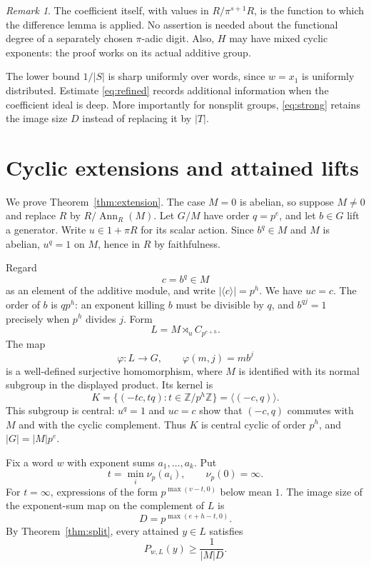\documentclass[11pt]{article}
\theoremstyle{remark}\newtheorem{remark}[theorem]{Remark}
\newcommand{\Ann}{\operatorname{Ann}}
\newcommand{\Z}{\mathbb Z}
\begin{document}
\begin{remark}
The coefficient itself, with values in $R/\pi^{s+1}R$, is the function to which the difference lemma is applied. No assertion is needed about the functional degree of a separately chosen $\pi$-adic digit. Also, $H$ may have mixed cyclic exponents: the proof works on its actual additive group.
\end{remark}

The lower bound $1/|S|$ is sharp uniformly over words, since $w=x_1$ is uniformly distributed. Estimate \eqref{eq:refined} records additional information when the coefficient ideal is deep. More importantly for nonsplit groups, \eqref{eq:strong} retains the image size $D$ instead of replacing it by $|T|$.

\section{Cyclic extensions and attained lifts}\label{sec:transfer}
We prove Theorem~\ref{thm:extension}. The case $M=0$ is abelian, so suppose $M\ne0$ and replace $R$ by $R/\Ann_R(M)$. Let $G/M$ have order $q=p^e$, and let $b\in G$ lift a generator. Write $u\in1+\pi R$ for its scalar action. Since $b^q\in M$ and $M$ is abelian, $u^q=1$ on $M$, hence in $R$ by faithfulness.

Regard
\[
 c=b^q\in M
\]
as an element of the additive module, and write $|\langle c\rangle|=p^h$. We have $uc=c$. The order of $b$ is $qp^h$: an exponent killing $b$ must be divisible by $q$, and $b^{qj}=1$ precisely when $p^h$ divides $j$. Form
\[
 L=M\rtimes_u C_{p^{e+h}}.
\]
The map
\begin{equation}\label{eq:cover}
 \varphi:L\longrightarrow G,\qquad \varphi(m,j)=m b^j
\end{equation}
is a well-defined surjective homomorphism, where $M$ is identified with its normal subgroup in the displayed product. Its kernel is
\begin{equation}\label{eq:kernel}
 K=\{(-tc,tq):t\in\Z/p^h\Z\}=\langle(-c,q)\rangle.
\end{equation}
This subgroup is central: $u^q=1$ and $uc=c$ show that $(-c,q)$ commutes with $M$ and with the cyclic complement. Thus $K$ is central cyclic of order $p^h$, and $|G|=|M|p^e$.

Fix a word $w$ with exponent sums $a_1,\ldots,a_k$. Put
\[
 t=\min_i\nu_p(a_i),\qquad \nu_p(0)=\infty.
\]
For $t=\infty$, expressions of the form $p^{\max(v-t,0)}$ below mean $1$. The image size of the exponent-sum map on the complement of $L$ is
\[
 D=p^{\max(e+h-t,0)}.
\]
By Theorem~\ref{thm:split}, every attained $y\in L$ satisfies
\begin{equation}\label{eq:coverbound}
 P_{w,L}(y)\ge\frac1{|M|D}.
\end{equation}
\end{document}
